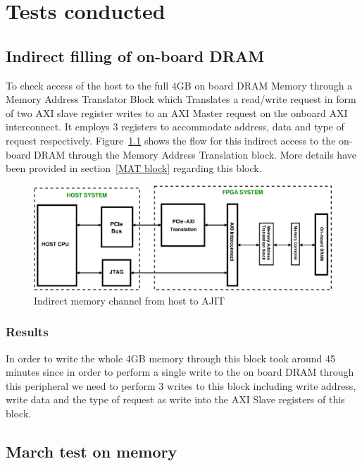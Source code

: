 \chapter{Tests conducted}

\section{Indirect filling of on-board DRAM}

To check access of the host to the full 4GB on board DRAM Memory through a Memory Address Translator Block which Translates a read/write
request in form of two AXI slave register writes to an AXI Master request on the onboard AXI interconnect. It employs 3 registers to
accommodate address, data and type of request respectively. Figure~\ref{MAT flow} shows the flow for this indirect access to the on-board
DRAM through the Memory Address Translation block. More details have been provided in section~\ref{MAT block} regarding this block.

\begin{figure}[H]
\centering
\includegraphics[width=\textwidth]{eps_pdf_sources/ajit_fpga/Tests_conducted/MAT}
\caption{Indirect memory channel from host to AJIT}
\label{MAT flow}
\end{figure}

\subsection{Results}

In order to write the whole 4GB memory through this block took around 45 minutes since in order to perform a single write to the on board
DRAM through this peripheral we need to perform 3 writes to this block including write address, write data and the type of request as write
into the AXI Slave registers of this block.

\section{March test on memory}

